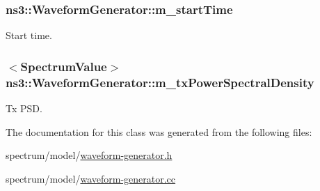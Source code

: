\subsubsection[{\texorpdfstring{m\+\_\+start\+Time}{m_startTime}}]{ ns3\+::\+Waveform\+Generator\+::m\+\_\+start\+Time\hspace{0.3cm}{\ttfamily [private]}}\hypertarget{classns3_1_1WaveformGenerator_aad36cca1eea96f150758fa9bb5a23a7f}{}\label{classns3_1_1WaveformGenerator_aad36cca1eea96f150758fa9bb5a23a7f}


Start time. 

\subsubsection[{\texorpdfstring{m\+\_\+tx\+Power\+Spectral\+Density}{m_txPowerSpectralDensity}}]{$<${\bf Spectrum\+Value}$>$ ns3\+::\+Waveform\+Generator\+::m\+\_\+tx\+Power\+Spectral\+Density\hspace{0.3cm}{\ttfamily [private]}}\hypertarget{classns3_1_1WaveformGenerator_aaaf34dd52b0c13ad171482849acc4d22}{}\label{classns3_1_1WaveformGenerator_aaaf34dd52b0c13ad171482849acc4d22}


Tx P\+SD. 



The documentation for this class was generated from the following files\+:\begin{DoxyCompactItemize}
\item 
spectrum/model/\hyperlink{waveform-generator_8h}{waveform-\/generator.\+h}\item 
spectrum/model/\hyperlink{waveform-generator_8cc}{waveform-\/generator.\+cc}\end{DoxyCompactItemize}
